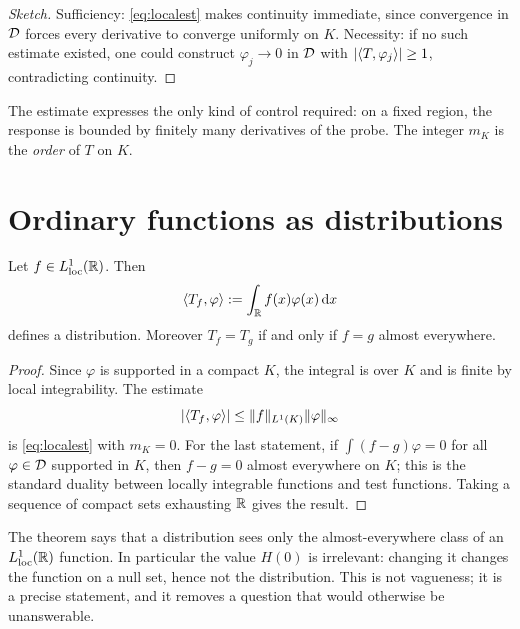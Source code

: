 \begin{proof}[Sketch]
Sufficiency: \eqref{eq:localest} makes continuity immediate, since convergence in $\mathcal{D}$ forces every
derivative to converge uniformly on $K$. Necessity: if no such estimate existed, one could construct
$\varphi_{j}\to0$ in $\mathcal{D}$ with $|\langle T,\varphi_{j}\rangle|\ge1$, contradicting continuity.
\end{proof}

The estimate expresses the only kind of control required: on a fixed region, the response is bounded
by finitely many derivatives of the probe. The integer $m_{K}$ is the \emph{order} of $T$ on $K$.

\section{Ordinary functions as distributions}

\begin{theorem}[embedding]\label{thm:embedding}
Let $f\in L^{1}_{\mathrm{loc}}(\mathbb{R})$. Then
\begin{equation}
\langle T_{f},\varphi\rangle:=\int_{\mathbb{R}}f(x)\varphi(x)\,\mathrm{d} x
\end{equation}
defines a distribution. Moreover $T_{f}=T_{g}$ if and only if $f=g$ almost everywhere.
\end{theorem}

\begin{proof}
Since $\varphi$ is supported in a compact $K$, the integral is over $K$ and is finite by local
integrability. The estimate
\begin{equation}
|\langle T_{f},\varphi\rangle|\le\|f\|_{L^{1}(K)}\|\varphi\|_{\infty}
\end{equation}
is \eqref{eq:localest} with $m_{K}=0$. For the last statement, if $\int(f-g)\varphi=0$ for all
$\varphi\in\mathcal{D}$ supported in $K$, then $f-g=0$ almost everywhere on $K$; this is the standard
duality between locally integrable functions and test functions. Taking a sequence of compact sets
exhausting $\mathbb{R}$ gives the result.
\end{proof}

\begin{remark}
The theorem says that a distribution sees only the almost-everywhere class of an $L^{1}_{\mathrm{loc}}(\mathbb{R})$ function.
In particular the value $H(0)$ is irrelevant: changing it changes the function on a null set, hence
not the distribution. This is not vagueness; it is a precise statement, and it removes a question
that would otherwise be unanswerable.
\end{remark}

